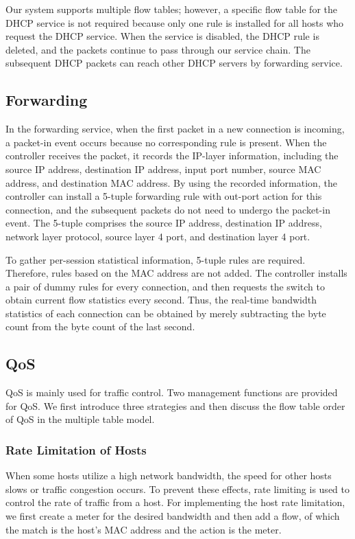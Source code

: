 \documentclass[10pt,journal]{IEEEtran}
\begin{document}
Our system supports multiple flow tables; however, a specific flow table for the DHCP service is not required because only one rule is installed for all hosts who request the DHCP service. When the service is disabled, the DHCP rule is deleted, and the packets continue to pass through our service chain. The subsequent DHCP packets can reach other DHCP servers by forwarding service.



\subsection{Forwarding} \label{ssec:forwarding}
In the forwarding service, when the first packet in a new connection is incoming, a packet-in event occurs because no corresponding rule is present. When the controller receives the packet, it records the IP-layer information, including the source IP address, destination IP address, input port number, source MAC address, and destination MAC address. By using the recorded information, the controller can install a 5-tuple forwarding rule with out-port action for this connection, and the subsequent packets do not need to undergo the packet-in event. The 5-tuple comprises the source IP address, destination IP address, network layer protocol, source layer 4 port, and destination layer 4 port.

To gather per-session statistical information, 5-tuple rules are required. Therefore, rules based on the MAC address are not added. The controller installs a pair of dummy rules for every connection, and then requests the switch to obtain current flow statistics every second. Thus, the real-time bandwidth statistics of each connection can be obtained by merely subtracting the byte count from the byte count of the last second.



\subsection{QoS}
QoS is mainly used for traffic control. Two management functions are provided for QoS. We first introduce three strategies and then discuss the flow table order of QoS in the multiple table model.

\subsubsection{Rate Limitation of Hosts}
When some hosts utilize a high network bandwidth, the speed for other hosts slows or traffic congestion occurs. To prevent these effects, rate limiting is used to control the rate of traffic from a host. For implementing the host rate limitation, we first create a meter for the desired bandwidth and then add a flow, of which the match is the host’s MAC address and the action is the meter.
\end{document}

